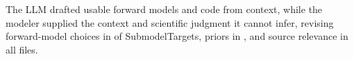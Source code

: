 The LLM drafted usable forward models and code from context, while the modeler supplied the context and scientific judgment it cannot infer, revising forward-model choices in \smtFmTypeChangedPct{} of SubmodelTargets, priors in \smtPriorChangedPct{}, and source relevance in all files.
